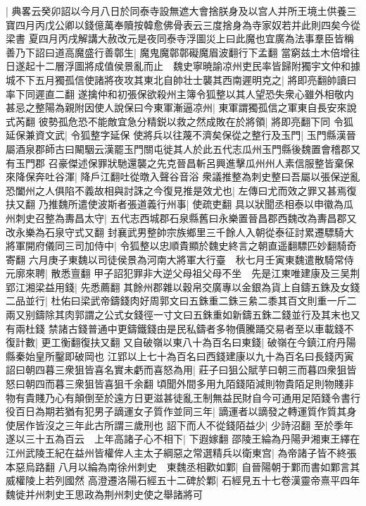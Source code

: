 |{
	典畧云癸卯詔以今月八日於同泰寺設無遮大會捨朕身及以宫人并所王境土供養三寶四月丙戊公卿以錢億萬奉贖按韓愈佛骨表云三度捨身為寺家奴若并此則四矣今從梁書}
夏四月丙戌解講大赦改元是夜同泰寺浮圖災上曰此魔也宜廣為法事羣臣皆稱善乃下詔曰道高魔盛行善鄣生|{
	魔鬼魔鄣鄣礙魔眉波翻行下孟翻}
當窮兹土木倍增往日遂起十二層浮圖將成值侯景亂而止　魏史寧暁諭凉州吏民率皆歸附獨宇文仲和據城不下五月獨孤信使諸將夜攻其東北自帥壮士襲其西南遲明克之|{
	將即亮翻帥讀曰率下同遲直二翻}
遂擒仲和初張保欲殺州主簿令狐整以其人望恐失衆心雖外相敬内甚忌之整陽為親附因使人說保曰今東軍漸逼凉州|{
	東軍謂獨孤信之軍東自長安來說式芮翻}
彼勢孤危恐不能敵宜急分精鋭以救之然成敗在於將領|{
	將即亮翻下同}
令狐延保兼資文武|{
	令狐整字延保}
使將兵以往蔑不濟矣保從之整行及玉門|{
	玉門縣漢晉屬酒泉郡師古曰闞駰云漢罷玉門關屯徙其人於此五代志瓜州玉門縣後魏置會稽郡又有玉門郡}
召豪傑述保罪狀馳還襲之先克晉昌斬呂興進擊瓜州州人素信服整皆棄保來降保奔吐谷渾|{
	降戶江翻吐從暾入聲谷音浴}
衆議推整為刺史整曰吾屬以張保逆亂恐闔州之人俱陷不義故相與討誅之今復見推是效尤也|{
	左傳曰尤而效之罪又甚焉復扶又翻}
乃推魏所遣使波斯者張道義行州事|{
	使疏吏翻}
具以狀聞丞相泰以申徽為瓜州刺史召整為夀昌太守|{
	五代志西城郡石泉縣舊曰永樂置晉昌郡西魏改為夀昌郡又改永樂為石泉守式又翻}
封襄武男整帥宗族鄉里三千餘人入朝從泰征討累遷驃騎大將軍開府儀同三司加侍中|{
	令狐整以忠順貴顯於魏史終言之朝直遥翻驃匹妙翻騎奇寄翻}
六月庚子東魏以司徒侯景為河南大將軍大行臺　秋七月壬寅東魏遣散騎常侍元廓來聘|{
	散悉亶翻}
甲子詔犯罪非大逆父母祖父母不坐　先是江東唯建康及三吴荆郢江湘梁益用錢|{
	先悉薦翻}
其餘州郡雜以穀帛交廣專以金銀為貨上自鑄五銖及女錢二品並行|{
	杜佑曰梁武帝鑄錢肉好周郭文曰五銖重二銖三絫二黍其百文則重一斤二兩又别鑄除其肉郭謂之公式女錢徑一寸文曰五銖重如新鑄五銖二錢並行及其末也又有兩杜錢}
禁諸古錢普通中更鑄鐵錢由是民私鑄者多物價騰踊交易者至以車載錢不復計數|{
	更工衡翻復扶又翻}
又自破嶺以東八十為百名曰東錢|{
	破嶺在今鎮江府丹陽縣秦始皇所鑿即破岡也}
江郢以上七十為百名曰西錢建康以九十為百名曰長錢丙寅詔曰朝四暮三衆狙皆喜名實未虧而喜怒為用|{
	莊子曰狙公賦芋曰朝三而暮四衆狙皆怒曰朝四而暮三衆狙皆喜狙千余翻}
頃聞外間多用九陌錢陌減則物貴陌足則物賤非物有貴賤乃心有顛倒至於遠方日更滋甚徒亂王制無益民財自今可通用足陌錢令書行役百日為期若猶有犯男子謫運女子質作並同三年|{
	謫運者以謫發之轉運質作質其身使居作皆沒之三年此古所謂三歲刑也}
詔下而人不從錢陌益少|{
	少詩沼翻}
至於季年遂以三十五為百云　上年高諸子心不相下|{
	下遐嫁翻}
邵陵王綸為丹陽尹湘東王繹在江州武陵王紀在益州皆權侔人主太子綱惡之常選精兵以衛東宫|{
	為帝諸子皆不終張本惡烏路翻}
八月以綸為南徐州刺史　東魏丞相歡如鄴|{
	自晉陽朝于鄴而書如鄴言其威權陵上若列國然}
高澄遷洛陽石經五十二碑於鄴|{
	石經見五十七卷漢靈帝熹平四年}
魏徙并州刺史王思政為荆州刺史使之舉諸將可


